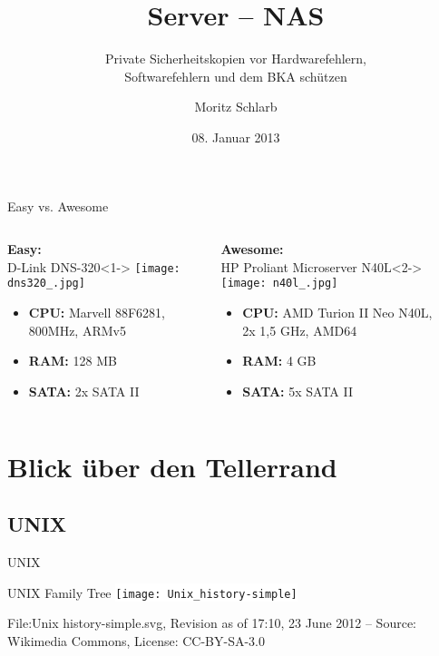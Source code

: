 \documentclass[pdflatex, ngerman]{beamer}
\title[Server NAS]{Server -- NAS}
\subtitle[Kurzform]{Private Sicherheitskopien vor Hardwarefehlern, \\Softwarefehlern und dem BKA schützen}
\author[Moritz Schlarb]{Moritz Schlarb}
\institute[JGU Mainz]{Institut für Informatik\\ Johannes Gutenberg-Universität Mainz}
\date[08.01.2013]{08. Januar 2013}
\begin{document}
\frame{
	\titlepage
}


\begin{frame}{Easy vs. Awesome}
\begin{columns}
\begin{block}{\textbf{Easy:} \\ D-Link DNS-320}<1->
\texttt{[image: dns320\_.jpg]}
\begin{footnotesize}
  \begin{itemize}
    \item \textbf{CPU:} Marvell 88F6281, \\ 800MHz, ARMv5
    \item \textbf{RAM:} 128 MB
    \item \textbf{SATA:} 2x SATA II
  \end{itemize}
\end{footnotesize}
\end{block}
\begin{block}{\textbf{Awesome:} \\ HP Proliant Microserver N40L}<2->
\texttt{[image: n40l\_.jpg]}
\begin{footnotesize}
  \begin{itemize}
    \item \textbf{CPU:} {AMD Turion II Neo N40L}, \\ 2x 1,5 GHz, AMD64
    \item \textbf{RAM:} 4 GB
    \item \textbf{SATA:} 5x SATA II
  \end{itemize}
\end{footnotesize}
\end{block}
\end{columns}
\end{frame}

\section{Blick über den Tellerrand}

\subsection{UNIX}

\begin{frame}{UNIX}
\begin{block}{UNIX Family Tree}
	\centering\colorbox{white}{\texttt{[image: Unix\_history-simple]}}

   	{\tiny File:Unix history-simple.svg, Revision as of 17:10, 23 June 2012 --
   	Source: Wikimedia Commons, License: CC-BY-SA-3.0
   	}
\end{block}
\end{frame}
\end{document}
